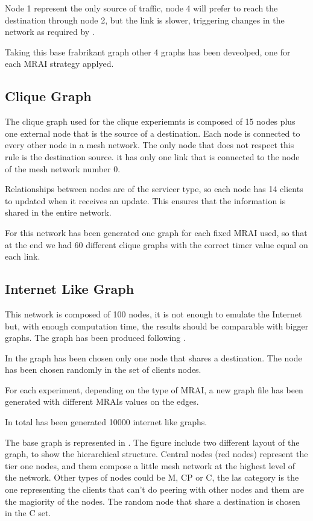 \documentclass[10pt,conference,letterpaper]{IEEEtran}
\begin{document}
Node 1 represent the only source of traffic, node 4 will prefer to reach the 
destination through node 2, but the link is slower, triggering changes in the
network as required by \cite{fabrikant}.

Taking this base frabrikant graph other 4 graphs has been deveolped, one for each
\ac{MRAI} strategy applyed.

\subsection{Clique Graph}
\label{subsec:clique_graph}

The clique graph used for the clique experiemnts is composed of \num{15} nodes
plus one external node that is the source of a destination.
Each node is connected to every other node in a mesh network. The only node that
does not respect this rule is the destination source. it has only one link 
that is connected to the node of the mesh network number \num{0}.

Relationships between nodes are of the servicer type, so each node has \num{14}
clients to updated when it receives an update.
This ensures that the information is shared in the entire network.

For this network has been generated one graph for each fixed \ac{MRAI} used, so
that at the end we had \num{60} different clique graphs with the correct timer value
equal on each link.

\subsection{Internet Like Graph}
\label{subsec:internet_graph}

This network is composed of \num{100} nodes, it is not enough to emulate the Internet
but, with enough computation time, the results should be comparable with bigger graphs.
The graph has been produced following \cite{elmokashfi}.

In the graph has been chosen only one node that shares a destination.
The node has been chosen randomly in the set of clients nodes.

For each experiment, depending on the type of \ac{MRAI}, a new graph file has
been generated with different \ac{MRAI}s values on the edges.

In total has been generated \num{10000} internet like graphs.

The base graph is represented in . The figure
include two different layout of the graph, to show the hierarchical structure.
Central nodes (red nodes) represent the tier one nodes, and them compose a little
mesh network at the highest level of the network.
Other types of nodes could be M, CP or C, the las category is the one representing
the clients that can't do peering with other nodes and them are the magiority
of the nodes.
The random node that share a destination is chosen in the C set.
\end{document}
